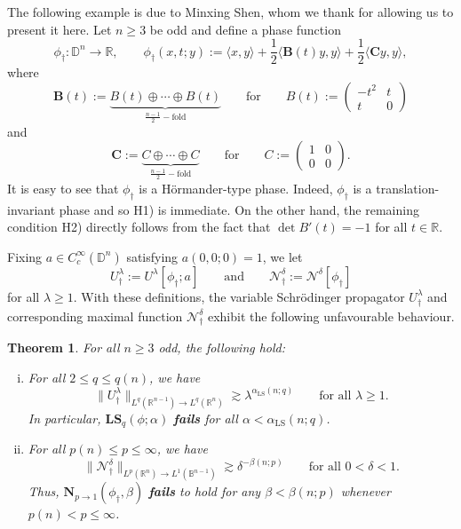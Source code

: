 \documentclass[reqno]{amsart}
\numberwithin{equation}{section}
\newcommand{\B}{\mathbb{B}}
\newcommand{\D}{\mathbb{D}}
\newcommand{\R}{\mathbb{R}}
\newcommand{\cN}{\mathcal{N}}
\newcommand{\bB}{\mathbf{B}}
\newcommand{\bC}{\mathbf{C}}
\newcommand{\bN}{\mathbf{N}}
\newcommand{\bLS}{\mathbf{LS}}
\def\inn#1#2{\langle#1,#2\rangle}
\theoremstyle{plain}
\newtheorem{theorem}{Theorem}[section]
\theoremstyle{definition}
\begin{document}
The following example is due to Minxing Shen, whom we thank for allowing us to present it here. Let $n \geq 3$ be odd and define a phase function 
\begin{equation*}
\phi_{\dagger} \colon \D^n \to \R, \qquad \phi_{\dagger}(x,t; y) := \inn{x}{y} +\frac{1}{2} \inn{\bB(t)y}{y} + \frac{1}{2} \inn{\bC y}{y},
\end{equation*}
where
\begin{equation*}
\bB(t) := \underbrace{B(t) \oplus \cdots \oplus B(t)}_{\frac{n-1}{2}-\textrm{fold}} \qquad \textrm{for} \qquad B(t):=
\begin{pmatrix}
-t^2 &t
\\
t &0
\end{pmatrix}
\end{equation*}
and
\begin{equation*}
\bC := \underbrace{C \oplus \cdots \oplus C}_{\frac{n-1}{2}-\textrm{fold}} \qquad \textrm{for} \qquad C:=
\begin{pmatrix}
1 & 0
\\
0 & 0
\end{pmatrix}.
\end{equation*}
It is easy to see that $\phi_{\dagger}$ is a H\"ormander-type phase. Indeed, $\phi_{\dagger}$ is a translation-invariant phase and so H1) is immediate. On the other hand, the remaining condition H2) directly follows from the fact that $\det B'(t) = -1$ for all $t \in \R$.

Fixing $a \in C^{\infty}_c(\D^n)$ satisfying $a(0,0;0) = 1$, we let \begin{equation*}
    U_{\dagger}^{\lambda} := U^{\lambda}[\phi_{\dagger}; a] \qquad \textrm{and} \qquad  \cN^{\delta}_{\dagger} := \cN^{\delta}[\phi_{\dagger}] 
\end{equation*}
for all $\lambda \geq 1$. With these definitions, the variable Schr\"odinger propagator $U_{\dagger}^{\lambda}$ and corresponding maximal function $\cN^{\delta}_{\dagger}$ exhibit the following unfavourable behaviour.

\begin{theorem}\label{thm: sharp nik} For all $n \geq 3$ odd, the following hold:
\begin{enumerate}[i)]
    \item For all $2 \leq q \leq q(n)$, we have 
\begin{equation*}
\|U_{\dagger}^{\lambda}\|_{L^q(\R^{n-1}) \to L^q(\R^n)} \gtrsim \lambda^{\alpha_{\mathrm{LS}}(n;q)} \qquad \textrm{for all $\lambda \geq 1$.}
\end{equation*}
In particular, $\bLS_q(\phi; \alpha)$ \textbf{fails} for all $\alpha < \alpha_{\mathrm{LS}}(n;q)$.
    \item For all $p(n) \leq p \leq \infty$, we have
\begin{equation*}
    \|\cN^{\delta}_{\dagger}\|_{L^p(\R^n) \to L^1(\B^{n-1})} \gtrsim \delta^{-\beta(n; p)} \qquad \textrm{for all $0 < \delta < 1$.}
\end{equation*}
Thus, $\bN_{p \to 1}(\phi_{\dagger}, \beta)$ \textbf{fails} to hold for any $\beta < \beta(n; p)$ whenever $p(n) < p \leq \infty$.
\end{enumerate}
\end{theorem}
\end{document}
